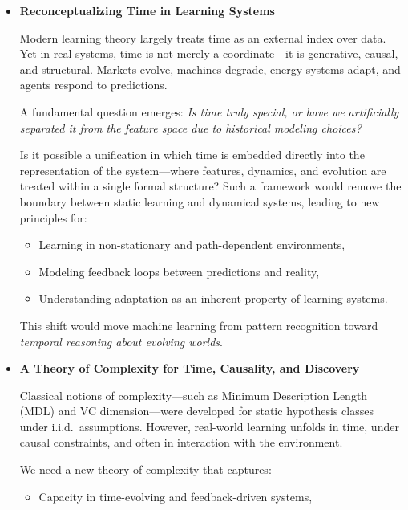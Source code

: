   \begin{itemize}
    \item \textbf{Reconceptualizing Time in Learning Systems}

      Modern learning theory largely treats time as an external index over
      data. Yet in real systems, time is not merely a coordinate—it is generative,
      causal, and structural. Markets evolve, machines degrade, energy
      systems adapt, and agents respond to predictions.

      A fundamental question emerges: \emph{Is time truly special, or have
      we artificially separated it from the feature space due to historical
      modeling choices?}

      Is it possible a unification in which time is embedded directly into
      the representation of the system—where features, dynamics, and
      evolution are treated within a single formal structure? Such a framework
      would remove the boundary between static learning and dynamical systems,
      leading to new principles for:
      \begin{itemize}
        \item Learning in non-stationary and path-dependent environments,

        \item Modeling feedback loops between predictions and reality,

        \item Understanding adaptation as an inherent property of learning
          systems.
      \end{itemize}

      This shift would move machine learning from pattern recognition
      toward \emph{temporal reasoning about evolving worlds}.

    \item \textbf{A Theory of Complexity for Time, Causality, and
      Discovery}

      Classical notions of complexity—such as Minimum Description Length
      (MDL) and VC dimension—were developed for static hypothesis classes
      under i.i.d.\ assumptions. However, real-world learning unfolds in
      time, under causal constraints, and often in interaction with the
      environment.

      We need a new theory of complexity that captures:
      \begin{itemize}
        \item Capacity in time-evolving and feedback-driven systems,


\end{itemize}
\end{itemize}
